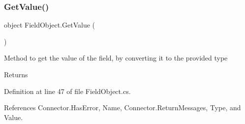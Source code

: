 \subsubsection{\texorpdfstring{Get\+Value()}{GetValue()}}
{\footnotesize\ttfamily object Field\+Object.\+Get\+Value (\begin{DoxyParamCaption}{ }\end{DoxyParamCaption})}



Method to get the value of the field, by converting it to the provided type 

\begin{DoxyReturn}{Returns}

\end{DoxyReturn}


Definition at line 47 of file Field\+Object.\+cs.



References Connector.\+Has\+Error, Name, Connector.\+Return\+Messages, Type, and Value.


